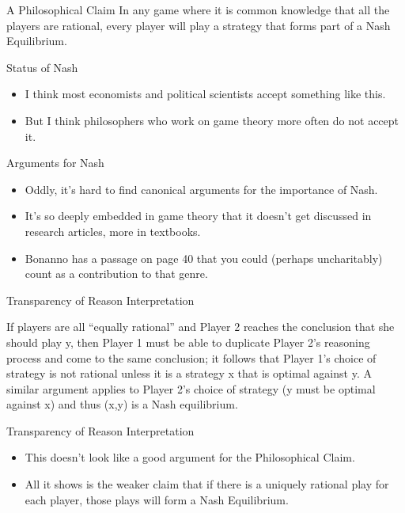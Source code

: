 \documentclass[
  14pt,
  letterpaper,
  ignorenonframetext,
  aspectratio=169,
  handout]{beamer}
\providecommand{\tightlist}{%
  \setlength{\itemsep}{0pt}\setlength{\parskip}{0pt}}\usepackage{longtable,booktabs,array}
\renewenvironment*{quote}	
	{\list{}{\rightmargin   \leftmargin} \item } 	
	{\endlist }
\let\olditem\item
\renewcommand{\item}{%
\olditem\vspace{6pt}}
\begin{document}
\begin{frame}{A Philosophical Claim}
\protect\hypertarget{a-philosophical-claim}{}
In any game where it is common knowledge that all the players are
rational, every player will play a strategy that forms part of a Nash
Equilibrium.
\end{frame}

\begin{frame}{Status of Nash}
\protect\hypertarget{status-of-nash}{}
\begin{itemize}[<+->]
\tightlist
\item
  I think most economists and political scientists accept something like
  this.
\item
  But I think philosophers who work on game theory more often do not
  accept it.
\end{itemize}
\end{frame}

\begin{frame}{Arguments for Nash}
\protect\hypertarget{arguments-for-nash}{}
\begin{itemize}[<+->]
\tightlist
\item
  Oddly, it's hard to find canonical arguments for the importance of
  Nash.
\item
  It's so deeply embedded in game theory that it doesn't get discussed
  in research articles, more in textbooks.
\item
  Bonanno has a passage on page 40 that you could (perhaps uncharitably)
  count as a contribution to that genre.
\end{itemize}
\end{frame}

\begin{frame}{Transparency of Reason Interpretation}
\protect\hypertarget{transparency-of-reason-interpretation}{}
\begin{quote}
If players are all ``equally rational'' and Player 2 reaches the
conclusion that she should play y, then Player 1 must be able to
duplicate Player 2's reasoning process and come to the same conclusion;
it follows that Player 1's choice of strategy is not rational unless it
is a strategy x that is optimal against y. A similar argument applies to
Player 2's choice of strategy (y must be optimal against x) and thus
(x,y) is a Nash equilibrium.
\end{quote}
\end{frame}

\begin{frame}{Transparency of Reason Interpretation}
\protect\hypertarget{transparency-of-reason-interpretation-1}{}
\begin{itemize}[<+->]
\tightlist
\item
  This doesn't look like a good argument for the Philosophical Claim.
\item
  All it shows is the weaker claim that if there is a uniquely rational
  play for each player, those plays will form a Nash Equilibrium.
\end{itemize}
\end{frame}
\end{document}
